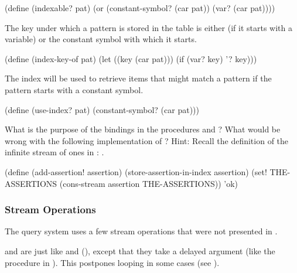 \begin{codeBlock}
(define (indexable? pat)
  (or (constant-symbol? (car pat))
      (var? (car pat))))
\end{codeBlock}

\noindent
The key under which a pattern is stored in the table is either  (if it
starts with a variable) or the constant symbol with which it starts.

\begin{codeBlock}
(define (index-key-of pat)
  (let ((key (car pat)))
    (if (var? key) '? key)))
\end{codeBlock}

\noindent
The index will be used to retrieve items that might match a pattern if the
pattern starts with a constant symbol.

\begin{codeBlock}
(define (use-index? pat) (constant-symbol? (car pat)))
\end{codeBlock}

\begin{exerciseGroup}
\label{Exercise 4.70}
 What is the purpose of the
 bindings in the procedures  and
 ?  What would be wrong with the following implementation of
 ?  Hint: Recall the definition of the infinite stream of
ones in : .

\begin{codeBlock}
(define (add-assertion! assertion)
  (store-assertion-in-index assertion)
  (set! THE-ASSERTIONS
        (cons-stream assertion THE-ASSERTIONS))
  'ok)
\end{codeBlock}
\end{exerciseGroup}

\subsubsection{Stream Operations}
\label{Section 4.4.4.6}

The query system uses a few stream operations that were not presented in
.

 and  are just like
 and  (), except that
they take a delayed argument (like the  procedure in
).  This postpones looping in some cases (see ).

